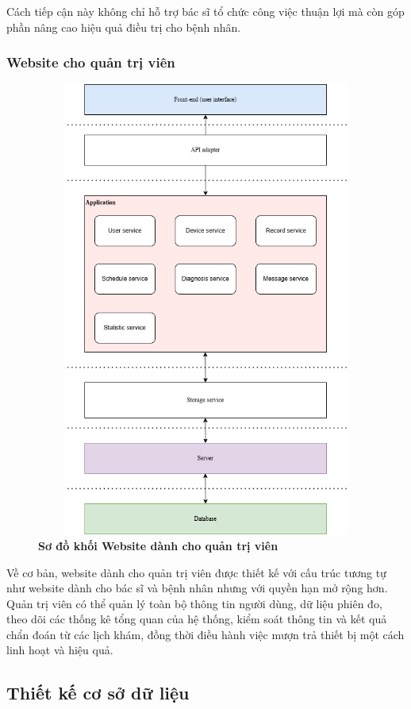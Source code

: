 Cách tiếp cận này không chỉ hỗ trợ bác sĩ tổ chức công việc thuận lợi mà còn góp phần nâng cao hiệu quả điều trị cho bệnh nhân.

\subsubsection{Website cho quản trị viên}
\begin{figure}[H]
	\centering
	\includegraphics[width=12cm,height=15cm]{Images/System/fmECG_architecture-Admin.drawio.png}
	\caption[Sơ đồ khối Website dành cho quản trị viên]{\bfseries \fontsize{12pt}{0pt}\selectfont Sơ đồ khối Website dành cho quản trị viên}
	\label{fmECG_architecture-Admin} %
\end{figure}
Về cơ bản, website dành cho quản trị viên được thiết kế với cấu trúc tương tự như website dành cho bác sĩ và bệnh nhân nhưng với quyền hạn mở rộng hơn.
Quản trị viên có thể quản lý toàn bộ thông tin người dùng, dữ liệu phiên đo, theo dõi các thống kê tổng quan của hệ thống, kiểm soát thông tin và kết quả chẩn đoán từ các lịch khám,
đồng thời điều hành việc mượn trả thiết bị một cách linh hoạt và hiệu quả.

\subsection{Thiết kế cơ sở dữ liệu}

